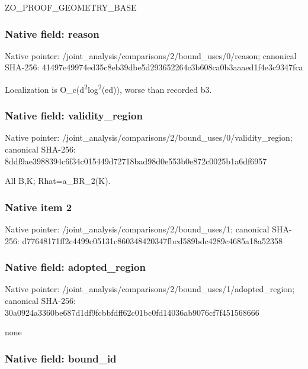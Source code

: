 \documentclass[10pt,a4paper]{article}
\begin{document}
ZO\_PROOF\_GEOMETRY\_BASE


\subsubsection{Native field: reason}


Native pointer: /joint\_analysis/comparis\allowbreak{}ons/2/bound\_uses/0/reaso\allowbreak{}n; canonical SHA-256: 41497e49974ed35c8eb39dbe\allowbreak{}5d293652264c3b608ca0b3aa\allowbreak{}aed1f4e3c9347fca


Localization is O\_c(d\textsuperscript{2}log\textsuperscript{2}(ed)), worse than recorded b3.


\subsubsection{Native field: validity\_region}


Native pointer: /joint\_analysis/comparis\allowbreak{}ons/2/bound\_uses/0/valid\allowbreak{}ity\_region; canonical SHA-256: 8ddf9ae3988394c6f34c0154\allowbreak{}49d72718bad98d0e553b0e87\allowbreak{}2c0025b1a6df6957


All B,K; Rhat=a\_BR\_2(K).


\subsubsection{Native item 2}


Native pointer: /joint\_analysis/comparis\allowbreak{}ons/2/bound\_uses/1; canonical SHA-256: d77648171ff2c4499c05131c\allowbreak{}860348420347fbcd589bdc42\allowbreak{}89c4685a18a52358



\subsubsection{Native field: adopted\_region}


Native pointer: /joint\_analysis/comparis\allowbreak{}ons/2/bound\_uses/1/adopt\allowbreak{}ed\_region; canonical SHA-256: 30a0924a3360be687d1df9fc\allowbreak{}bbfdff62c01bc0fd14036ab9\allowbreak{}076cf7f451568666


none


\subsubsection{Native field: bound\_id}
\end{document}
